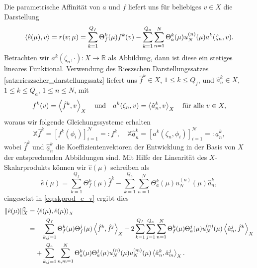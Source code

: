 Die parametrische Affinität von $a$ und $f$ liefert uns für beliebiges $v \in X$ die Darstellung
\begin{equation}
    \label{eq:skprod_e_v}
    \skprod{\hat e(\mu)}{v} = r(v; \mu) = \sum_{k=1}^{Q_f} \Theta_f^k(\mu) f^k(v) - \sum_{k=1}^{Q_a} \sum_{n=1}^{N} \Theta_a^k(\mu) u_N^{(n)}(\mu)a^k(\zeta_n, v).
\end{equation}
Betrachten wir $a^k(\zeta_n, \cdot) \colon X \to \mathbb{R}$ als Abbildung, dann ist diese ein stetiges lineares Funktional. Verwendung des Rieszschen Darstellungssatzes \ref{satz:rieszscher_darstellungssatz} liefert uns $\hat f^k \in X$, $1 \leq k \leq Q_f$, und $\hat a^k_n \in X$, $1 \leq k \leq Q_a$, $1 \leq n \leq N$, mit
\begin{equation}
    f^k(v) = \skprod{\hat f^k}{v}_X \quad\text{und}\quad a^k(\zeta_n, v) = \skprod{\hat a^k_n}{v}_X \quad \fa v \in X,
\end{equation}
woraus wir folgende Gleichungssysteme erhalten
\begin{equation}
    \label{eq:Xf_eq_f_and_Xa_eq_a}
    \mathbb{X} \underline{\hat{f}}^k = [f^k(\phi_i)]_{i=1}^{\mathcal N} =: \underline f^k, \quad \mathbb{X} \underline{\hat{a}}^k_n = [a^k(\zeta_n, \phi_i)]_{i=1}^{\mathcal N} =: \underline a^k_n,
\end{equation}
wobei $\underline{\hat{f}}^k$ und $\underline{\hat{a}}^k_n$ die Koeffizientenvektoren der Entwicklung in der Basis von $X$ der entsprechenden Abbildungen sind.
Mit Hilfe der Linearität des $X$-Skalarprodukts können wir $\hat e(\mu)$ schreiben als
\begin{equation}
    \hat e(\mu) = \sum_{k=1}^{Q_f} \Theta_f^k(\mu) \hat f^k - \sum_{k=1}^{Q_a} \sum_{n=1}^{N} \Theta_a^k(\mu) u_N^{(n)}(\mu) \hat a^k_n,
\end{equation}
eingesetzt in \eqref{eq:skprod_e_v} ergibt dies
\begin{align}
    \label{eq:residumnorm}
    \norm{\hat e(\mu)}^2_X
    &= \skprod{\hat e(\mu)}{\hat e(\mu)}_X \\
    &=
    \begin{aligned}[t]
    &\sum_{k, j = 1}^{Q_f} \Theta_f^k(\mu) \Theta_f^j(\mu) \skprod{\hat f^k}{\hat f^j}_X - 2 \sum_{k = 1}^{Q_f} \sum_{j = 1}^{Q_a} \sum_{n = 1}^N \Theta_f^k(\mu) \Theta_a^j(\mu) u_N^{(n)}(\mu) \skprod{\hat a^j_n}{\hat f^k}_X \\
    + &\sum_{k, j = 1}^{Q_a} \sum_{n, m = 1}^N \Theta_a^k(\mu) \Theta_a^j(\mu) u_N^{(n)}(\mu)u_N^{(m)}(\mu) \skprod{\hat a_n^k}{\hat a_m^j}_X.
    \end{aligned}
\end{align}
